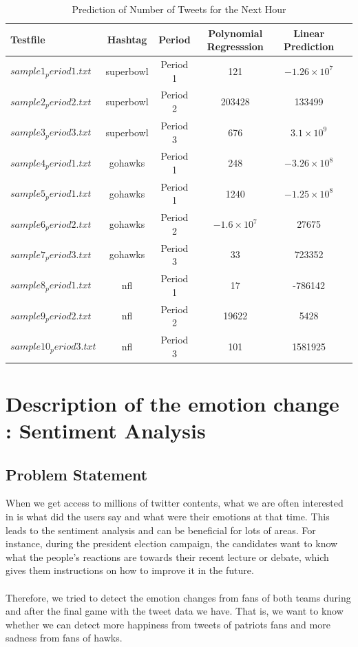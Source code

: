 \documentclass{article}
\begin{document}
\begin{table}
\caption{Prediction of Number of Tweets for the Next Hour}
\begin{adjustbox}{center}
\label{tb:p51}
\begin{tabular}{|l||c|c|c|c|c|}
\hline
Testfile & Hashtag & Period  & Polynomial Regresssion& Linear Prediction \\
\hline
$sample1_period1.txt$&superbowl&Period 1&121&$-1.26\times 10^7$\\
$sample2_period2.txt$&superbowl&Period 2&203428&133499\\
$sample3_period3.txt$&superbowl&Period 3&676&$3.1\times 10^9$\\
$sample4_period1.txt$&gohawks&Period 1&248&$-3.26\times 10^8$\\
$sample5_period1.txt$&gohawks&Period 1&1240&$-1.25\times 10^8$\\
$sample6_period2.txt$&gohawks&Period 2&$-1.6\times 10^7$&27675 \\
$sample7_period3.txt$&gohawks&Period 3&33&723352\\
$sample8_period1.txt$&nfl&Period 1&17&-786142\\
$sample9_period2.txt$&nfl&Period 2&19622&5428\\
$sample10_period3.txt$&nfl&Period 3&101&1581925\\
\hline
\end{tabular}
\end{adjustbox}
\end{table}

\section{Description of the emotion change : Sentiment Analysis}
\subsection{Problem Statement}
When we get access to millions of twitter contents, what we are often interested in is what did the users say and what were their emotions at that time. This leads to the sentiment analysis and can be beneficial for lots of areas. For instance, during the president election campaign, the candidates want to know what the people's reactions are towards their recent lecture or debate, which gives them instructions on how to improve it in the future.\\
\\
Therefore, we tried to detect the emotion changes from fans of both teams during and after the final game with the tweet data we have. That is, we want to know whether we can detect more happiness from tweets of patriots fans and more sadness from fans of hawks.
\end{document}

